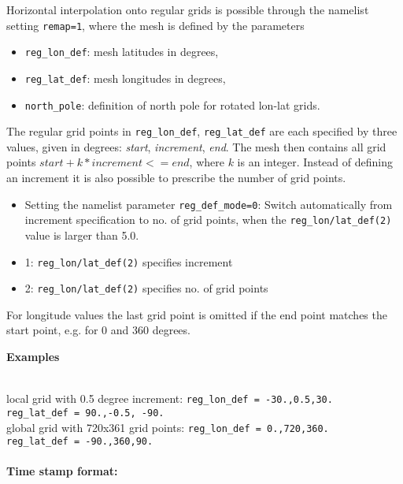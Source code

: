 Horizontal interpolation onto regular grids is possible through the namelist setting  \texttt{remap=1}, where
the mesh is defined by the parameters
\begin{itemize}
  \item \texttt{reg\_lon\_def}: mesh latitudes in degrees,
  \item \texttt{reg\_lat\_def}: mesh longitudes in degrees,
  \item \texttt{north\_pole}: definition of north pole for rotated lon-lat grids.
\end{itemize}
The regular grid points in \texttt{reg\_lon\_def}, \texttt{reg\_lat\_def} are each specified by three values, given in degrees:
\emph{start}, \emph{increment}, \emph{end}.
The mesh then contains all grid points $start + k * increment <= end$, where $k$ is an integer.
Instead of defining an increment it is also possible to prescribe the number of grid points.
\begin{itemize}
  \item Setting the namelist parameter \texttt{reg\_def\_mode=0}: 
        Switch automatically from increment specification to no. of grid points,
        when the  \texttt{reg\_lon/lat\_def(2)} value is larger than 5.0.
  \item 1: \texttt{reg\_lon/lat\_def(2)} specifies increment
  \item 2: \texttt{reg\_lon/lat\_def(2)} specifies no. of grid points
\end{itemize}
For longitude values the last grid point is omitted if the end point matches the start point, e.g. for 0 and 360 degrees.

\begin{tabbing}
  \parbox{0.7\textwidth}{\textbf{Examples}} \= \\
  local grid with 0.5 degree increment: \>
  \texttt{reg\_lon\_def = -30.,0.5,30.}
  \\ \>
  \texttt{reg\_lat\_def = 90.,-0.5, -90.}
  \\[0.5em]
  global grid with 720x361 grid points: \>
  \texttt{reg\_lon\_def = 0.,720,360.}
  \\ \>
  \texttt{reg\_lat\_def = -90.,360,90.}
\end{tabbing}


\paragraph{Time stamp format:}

